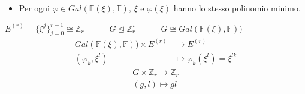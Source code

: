 \documentclass[mathserif]{beamer}
\newtheorem{teorema}{Teorema}
\begin{document}

\begin{frame}
\begin{itemize}
   \item Per ogni $\varphi \in Gal(\mathbb{F}(\xi), \mathbb{F})$, $\xi$ e $\varphi(\xi)$ hanno lo stesso
      polinomio minimo.
\end{itemize}

   $E^{(r)} = \lbrace \xi^{j}\rbrace_{j=0}^{r-1}\cong \mathbb{Z}_{r}  
   \qquad \quad
   G \trianglelefteq \mathbb{Z}_{r}^{\star} 
   \qquad  \quad 
   G \cong Gal(\mathbb{F}(\xi), \mathbb{F}))$
   \vspace{0.5cm}
   \begin{align*}
	Gal(\mathbb{F}(\xi), \mathbb{F})) \times E^{(r)}  & \longrightarrow  E^{(r)}   \\
		  (\varphi_{k},\xi^{l}) & \longmapsto \varphi_{k}(\xi^{l}) = \xi^{lk} 
    \end{align*}
    \begin{align*}	  
	G \times \mathbb{Z}_{r} \longrightarrow  \mathbb{Z}_{r}   \\
		  (g,l) \longmapsto gl
    \end{align*}
\end{frame}
\end{document}
